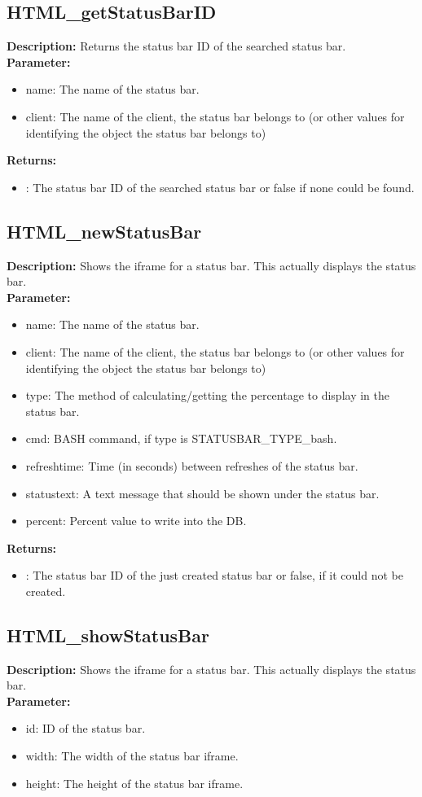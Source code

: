 \subsection{HTML\_getStatusBarID}
\textbf{Description:} Returns the status bar ID of the searched status bar.\\
\textbf{Parameter:}
\begin{itemize}
\item name: The name of the status bar.
\item client: The name of the client, the status bar belongs to (or other values for identifying the object the status bar belongs to)
\end{itemize}
\textbf{Returns:}
\begin{itemize}
\item : The status bar ID of the searched status bar or false if none could be found.
\end{itemize}

\subsection{HTML\_newStatusBar}
\textbf{Description:} Shows the iframe for a status bar. This actually displays the status bar.\\
\textbf{Parameter:}
\begin{itemize}
\item name: The name of the status bar.
\item client: The name of the client, the status bar belongs to (or other values for identifying the object the status bar belongs to)
\item type: The method of calculating/getting the percentage to display in the status bar.
\item cmd: BASH command, if type is STATUSBAR\_TYPE\_bash.
\item refreshtime: Time (in seconds) between refreshes of the status bar.
\item statustext: A text message that should be shown under the status bar.
\item percent: Percent value to write into the DB.
\end{itemize}
\textbf{Returns:}
\begin{itemize}
\item : The status bar ID of the just created status bar or false, if it could not be created.
\end{itemize}

\subsection{HTML\_showStatusBar}
\textbf{Description:} Shows the iframe for a status bar. This actually displays the status bar.\\
\textbf{Parameter:}
\begin{itemize}
\item id: ID of the status bar.
\item width: The width of the status bar iframe.
\item height: The height of the status bar iframe.
\end{itemize}

